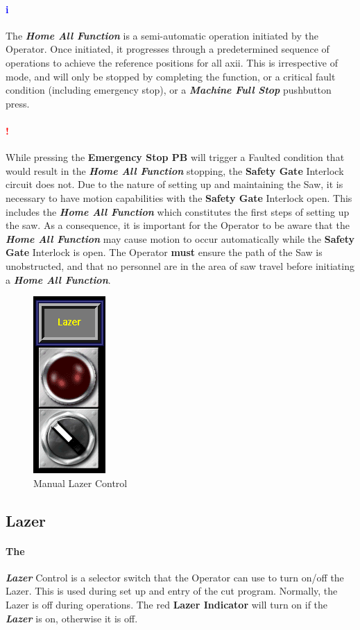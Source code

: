 \paragraph{\textbf{\LARGE \textcolor{blue}{i}}}The \textbf{\textit{Home All Function}} is a semi-automatic operation initiated by the Operator. Once initiated, it progresses through a predetermined sequence of operations to achieve the reference positions for all axii. This is irrespective of mode, and will only be stopped by completing the function, or a critical fault condition (including emergency stop), or a \textbf{\textit{Machine Full Stop}} pushbutton press.
\paragraph{\textbf{{\LARGE \textcolor{red}{!}}}} While pressing the \textbf{Emergency Stop PB} will trigger a Faulted condition that would result in the \textbf{\textit{Home All Function}} stopping, the \textbf{Safety Gate} Interlock circuit does not. Due to the nature of setting up and maintaining the Saw, it is necessary to have motion capabilities with the \textbf{Safety Gate} Interlock open. This includes the \textbf{\textit{Home All Function}} which constitutes the first steps of setting up the saw. As a consequence, it is important for the Operator to be aware that the \textbf{\textit{Home All Function}} may cause motion to occur automatically while the \textbf{Safety Gate} Interlock is open. The Operator \textbf{must} ensure the path of the Saw is unobstructed, and that no personnel are in the area of saw travel before initiating a \textbf{\textit{Home All Function}}.
\pagebreak
\begin{figure}
	\centering
	\includegraphics[width=.2\linewidth]{screen-captures/manual/manual-lazer}
	\caption{Manual Lazer Control}
	\label{fig:manual-lazer}
\end{figure}
\subsection{Lazer}\paragraph*{The}\textbf{\textit{Lazer}} Control is a selector switch that the Operator can use to turn on/off the Lazer. This is used during set up and entry of the cut program. Normally, the Lazer is off during operations. The red \textbf{Lazer Indicator} will turn on if the \textbf{\textit{Lazer}} is on, otherwise it is off.
